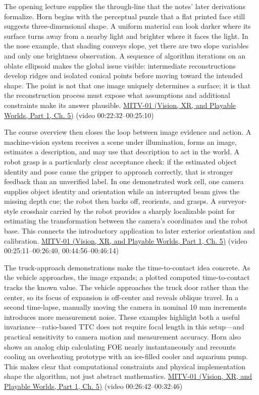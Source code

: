 The opening lecture supplies the through-line that the notes' later derivations formalize. Horn begins with the perceptual puzzle that a flat printed face still suggests three-dimensional shape. A uniform material can look darker where its surface turns away from a nearby light and brighter where it faces the light. In the nose example, that shading conveys slope, yet there are two slope variables and only one brightness observation. A sequence of algorithm iterations on an oblate ellipsoid makes the global issue visible: intermediate reconstructions develop ridges and isolated conical points before moving toward the intended shape. The point is not that one image uniquely determines a surface; it is that the reconstruction process must expose what assumptions and additional constraints make its answer plausible. \href{../07-Vision-XR-and-Playable-Worlds-P01/main.pdf\#04-visual-computing-ii-ch036-mitv-01---introduction-to-machine-vision}{MITV-01 (Vision, XR, and Playable Worlds, Part 1, Ch. 5)} (video 00:22:32--00:25:10)

The course overview then closes the loop between image evidence and action. A machine-vision system receives a scene under illumination, forms an image, estimates a description, and may use that description to act in the world. A robot grasp is a particularly clear acceptance check: if the estimated object identity and pose cause the gripper to approach correctly, that is stronger feedback than an unverified label. In one demonstrated work cell, one camera supplies object identity and orientation while an interrupted beam gives the missing depth cue; the robot then backs off, reorients, and grasps. A surveyor-style crosshair carried by the robot provides a sharply localizable point for estimating the transformation between the camera's coordinates and the robot base. This connects the introductory application to later exterior orientation and calibration. \href{../07-Vision-XR-and-Playable-Worlds-P01/main.pdf\#04-visual-computing-ii-ch036-mitv-01---introduction-to-machine-vision}{MITV-01 (Vision, XR, and Playable Worlds, Part 1, Ch. 5)} (video 00:25:11--00:26:40, 00:44:56--00:46:14)

The truck-approach demonstrations make the time-to-contact idea concrete. As the vehicle approaches, the image expands; a plotted computed time-to-contact tracks the known value. The vehicle approaches the truck door rather than the center, so its focus of expansion is off-center and reveals oblique travel. In a second time-lapse, manually moving the camera in nominal 10 mm increments introduces more measurement noise. These examples highlight both a useful invariance---ratio-based TTC does not require focal length in this setup---and practical sensitivity to camera motion and measurement accuracy. Horn also shows an analog chip calculating FOE nearly instantaneously and recounts cooling an overheating prototype with an ice-filled cooler and aquarium pump. This makes clear that computational constraints and physical implementation shape the algorithm, not just abstract mathematics. \href{../07-Vision-XR-and-Playable-Worlds-P01/main.pdf\#04-visual-computing-ii-ch036-mitv-01---introduction-to-machine-vision}{MITV-01 (Vision, XR, and Playable Worlds, Part 1, Ch. 5)} (video 00:26:42--00:32:46)


